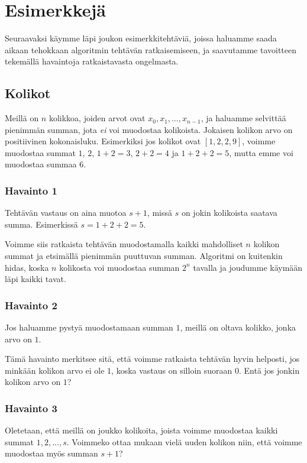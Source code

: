 \section{Esimerkkejä}

Seuraavaksi käymme läpi joukon esimerkkitehtäviä,
joissa haluamme saada aikaan tehokkaan algoritmin tehtävän ratkaisemiseen,
ja saavutamme tavoitteen tekemällä havaintoja ratkaistavasta ongelmasta.

\subsection{Kolikot}

Meillä on $n$ kolikkoa, joiden arvot ovat $x_0,x_1,\dots,x_{n-1}$,
ja haluamme selvittää pienimmän summan, jota \emph{ei} voi muodostaa kolikoista.
Jokaisen kolikon arvo on positiivinen kokonaisluku.
Esimerkiksi jos kolikot ovat $[1,2,2,9]$, voimme muodostaa summat
$1$, $2$, $1+2=3$, $2+2=4$ ja $1+2+2=5$,
mutta emme voi muodostaa summaa $6$.

\subsubsection{Havainto 1}

Tehtävän vastaus on aina muotoa $s+1$, missä $s$ on jokin kolikoista
saatava summa. Esimerkissä $s=1+2+2=5$.

Voimme siis ratkaista tehtävän
muodostamalla kaikki mahdolliset $n$ kolikon summat
ja etsimällä pienimmän puuttuvan summan.
Algoritmi on kuitenkin hidas, koska $n$ kolikosta voi
muodostaa summan $2^n$ tavalla ja joudumme käymään läpi kaikki tavat.

\subsubsection{Havainto 2}

Jos haluamme pystyä muodostamaan summan $1$,
meillä on oltava kolikko, jonka arvo on $1$.

Tämä havainto merkitsee sitä, että voimme ratkaista tehtävän
hyvin helposti, jos minkään kolikon arvo ei ole $1$,
koska vastaus on silloin suoraan $0$.
Entä jos jonkin kolikon arvo on $1$?

\subsubsection{Havainto 3}

Oletetaan, että meillä on joukko kolikoita,
joista voimme muodostaa kaikki summat $1,2,\dots,s$.
Voimmeko ottaa mukaan vielä uuden kolikon niin,
että voimme muodostaa myös summan $s+1$?

